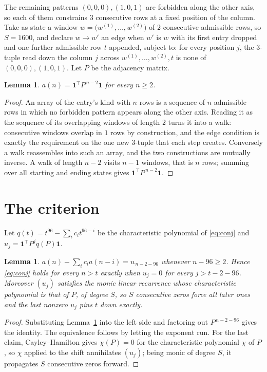 \documentclass[11pt,a4paper]{article}
\theoremstyle{plain}
\newtheorem{lemma}[theorem]{Lemma}
\theoremstyle{definition}
\begin{document}
The remaining patterns $(0,0,0), (1,0,1)$ are forbidden along the other axis, so each of them
constrains $3$ consecutive rows at a fixed position of the column. Take as state a
window $w=\bigl(w^{(1)},\dots,w^{(2)}\bigr)$ of $2$ consecutive admissible
rows, so $S=1600$, and declare $w\to w'$ an edge when $w'$ is $w$ with its first entry
dropped and one further admissible row $t$ appended, subject to: for every position
$j$, the $3$-tuple read down the column $j$ across $w^{(1)},\dots,w^{(2)},t$
is none of $(0,0,0), (1,0,1)$. Let $P$ be the adjacency matrix.

\begin{lemma}\label{lem:walk}
$a(n)=\mathbf{1}^{\!\top}P^{\,n-2}\mathbf{1}$ for every $n\ge2$.
\end{lemma}

\begin{proof}
An array of the entry's kind with $n$ rows is a sequence of $n$ admissible rows in
which no forbidden pattern appears along the other axis. Reading it as the sequence of its
overlapping windows of length $2$ turns it into a walk: consecutive windows overlap in
$1$ rows by construction, and the edge condition is exactly the requirement on the one
new $3$-tuple that each step creates. Conversely a walk reassembles into such an array,
and the two constructions are mutually inverse. A walk of length $n-2$ visits $n-1$
windows, that is $n$ rows; summing over all starting and ending states gives
$\mathbf{1}^{\!\top}P^{\,n-2}\mathbf{1}$.
\end{proof}

\section{The criterion}

Let $q(t)=t^{96}-\sum_i c_i t^{96-i}$ be the characteristic polynomial of
\eqref{eq:conj} and $u_j=\mathbf{1}^{\!\top}P^{j}q(P)\mathbf{1}$.

\begin{lemma}\label{lem:crit}
$a(n)-\sum_i c_i a(n-i)=u_{\,n-2-96}$ whenever $n-96\ge2$. Hence
\eqref{eq:conj} holds for every $n>t$ exactly when $u_j=0$ for every
$j>t-2-96$. Moreover $(u_j)$ satisfies the monic linear recurrence whose
characteristic polynomial is that of $P$, of degree $S$, so $S$ consecutive zeros force all
later ones and the last nonzero $u_j$ pins $t$ down exactly.
\end{lemma}

\begin{proof}
Substituting Lemma~\ref{lem:walk} into the left side and factoring out
$P^{\,n-2-96}$ gives the identity. The equivalence follows by letting the exponent
run. For the last claim, Cayley--Hamilton gives $\chi(P)=0$ for the characteristic
polynomial $\chi$ of $P$, so $\chi$ applied to the shift annihilates $(u_j)$; being monic of
degree $S$, it propagates $S$ consecutive zeros forward.
\end{proof}
\end{document}
